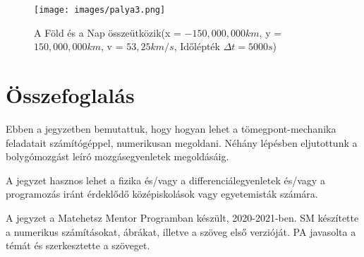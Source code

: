 \documentclass[%
 reprint,onecolumn,
 amsmath,amssymb,
 aps,
]{revtex4-2}
\begin{document}
\begin{figure}[!h]
    \centering
    \texttt{[image: images/palya3.png]}
    \caption{A Föld és a Nap összeütközik(x = $-150,000,000 km$, y = $150,000,000 km$, v = $53,25 km/s$, Időlépték $\Delta t = 5000 s$)}
    \label{fig:beleesik}
\end{figure}


\section{Összefoglalás}

Ebben a jegyzetben bemutattuk, hogy hogyan
lehet a tömegpont-mechanika feladatait számítógéppel, 
numerikusan megoldani. 
Néhány lépésben eljutottunk 
a bolygómozgást leíró mozgásegyenletek
megoldásáig.

A jegyzet hasznos lehet a fizika és/vagy a 
differenciálegyenletek és/vagy a programozás 
iránt érdeklődő középiskolások vagy
egyetemisták számára.

A jegyzet a Matehetsz Mentor Programban készült, 
2020-2021-ben. 
SM készítette a numerikus számításokat, ábrákat, illetve a szöveg 
első verzióját. PA javasolta a témát és szerkesztette a szöveget. 
\end{document}
